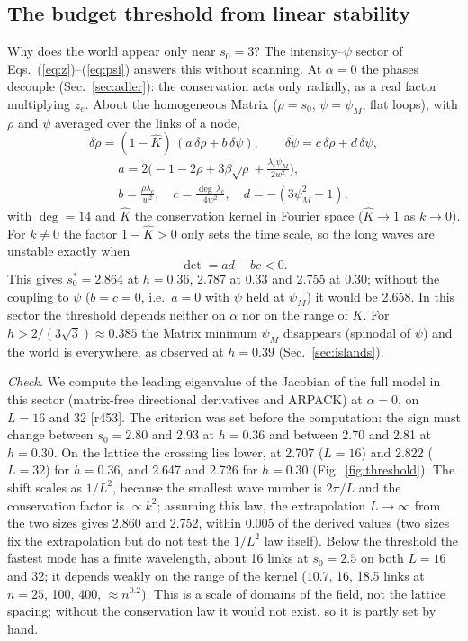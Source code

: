 \documentclass[reprint,pre,amsmath,amssymb,superscriptaddress,nofootinbib]{revtex4-2}
\newcommand{\sz}{s_0}
\newcommand{\szc}{s_0^{*}}
\begin{document}
\subsection{The budget threshold from linear stability}\label{sec:threshold}
Why does the world appear only near $\sz=3$? The intensity--$\psi$ sector of Eqs.~(\ref{eq:z})--(\ref{eq:psi}) answers this without scanning. At $\alpha=0$ the phases decouple (Sec.~\ref{sec:adler}): the conservation acts only radially, as a real factor multiplying $z_e$. About the homogeneous Matrix ($\rho=\sz$, $\psi=\psi_M$, flat loops), with $\rho$ and $\psi$ averaged over the links of a node,
\begin{equation}
\delta\dot\rho=(1-\hat K)\,(a\,\delta\rho+b\,\delta\psi),\qquad \delta\dot\psi=c\,\delta\rho+d\,\delta\psi, \label{eq:rhopsi}
\end{equation}
\begin{gather}
a=2\Big(-1-2\rho+3\beta\sqrt\rho+\frac{\lambda_c\psi_M}{2w^2}\Big),\nonumber\\
b=\frac{\rho\lambda_c}{w^2},\quad c=\frac{\deg\,\lambda_c}{4w^2},\quad d=-(3\psi_M^2-1),
\end{gather}
with $\deg=14$ and $\hat K$ the conservation kernel in Fourier space ($\hat K\to1$ as $k\to0$). For $k\neq0$ the factor $1-\hat K>0$ only sets the time scale, so the long waves are unstable exactly when
\begin{equation}
\det=ad-bc<0 .
\end{equation}
This gives $\szc=2.864$ at $h=0.36$, 2.787 at 0.33 and 2.755 at 0.30; without the coupling to $\psi$ ($b=c=0$, i.e.\ $a=0$ with $\psi$ held at $\psi_M$) it would be 2.658. In this sector the threshold depends neither on $\alpha$ nor on the range of $K$. For $h>2/(3\sqrt3)\approx0.385$ the Matrix minimum $\psi_M$ disappears (spinodal of $\psi$) and the world is everywhere, as observed at $h=0.39$ (Sec.~\ref{sec:islands}).

\emph{Check.} We compute the leading eigenvalue of the Jacobian of the full model in this sector (matrix-free directional derivatives and ARPACK) at $\alpha=0$, on $L=16$ and 32 [r453]. The criterion was set before the computation: the sign must change between $\sz=2.80$ and 2.93 at $h=0.36$ and between 2.70 and 2.81 at $h=0.30$. On the lattice the crossing lies lower, at 2.707 ($L=16$) and 2.822 ($L=32$) for $h=0.36$, and 2.647 and 2.726 for $h=0.30$ (Fig.~\ref{fig:threshold}). The shift scales as $1/L^2$, because the smallest wave number is $2\pi/L$ and the conservation factor is $\propto k^2$; assuming this law, the extrapolation $L\to\infty$ from the two sizes gives 2.860 and 2.752, within 0.005 of the derived values (two sizes fix the extrapolation but do not test the $1/L^2$ law itself). Below the threshold the fastest mode has a finite wavelength, about 16 links at $\sz=2.5$ on both $L=16$ and 32; it depends weakly on the range of the kernel (10.7, 16, 18.5 links at $n=25$, 100, 400, $\approx n^{0.2}$). This is a scale of domains of the field, not the lattice spacing; without the conservation law it would not exist, so it is partly set by hand.
\end{document}
